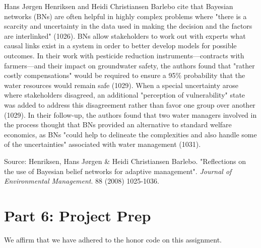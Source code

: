 \documentclass[11pt]{amsart}
\newcommand{\honor}{We affirm that we have adhered to the honor code on this assignment.}
\begin{document}
\begin{description}

\item[Bayesian belief networks for adaptive management] Hans Jørgen Henriksen and Heidi Christiansen Barlebo cite that
Bayesian networks (BNs) are often helpful in highly complex problems where "there is a scarcity and uncertainty in the
data used in making the decision and the factors are interlinked" (1026).  BNs allow stakeholders to work out with
experts what causal links exist in a system in order to better develop models for possible outcomes.  In their work
with pesticide reduction instruments\----contracts with farmers\----and their impact on groundwater safety, the authors
found that "rather costly compensations" would be required to ensure a 95\% probability that the water resources would
remain safe (1029).  When a special uncertainty arose where stakeholders disagreed, an additional "perception of
vulnerability" state was added to address this disagreement rather than favor one group over another (1029).  In their
follow-up, the authors found that two water managers involved in the process thought that BNs provided an alternative to
standard welfare economics, as BNs "could help to delineate the complexities and also handle some of the uncertainties"
associated with water management (1031).

Source:
Henriksen, Hans Jørgen \& Heidi Christiansen Barlebo.
"Reflections on the use of Bayesian belief networks for adaptive management".
\emph{Journal of Environmental Management}.
88 (2008) 1025-1036.

\item

\end{description}

\section*{Part 6: Project Prep}

\begin{description}

\item

\item

\end{description}

\honor
\end{document}
